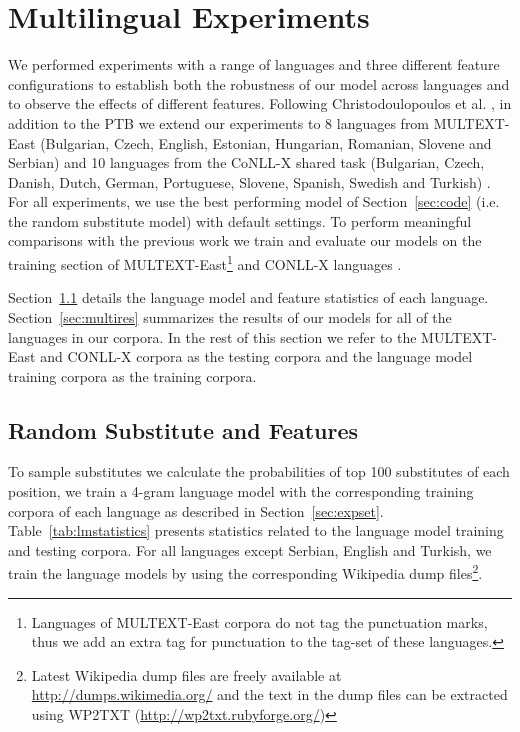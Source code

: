 \section{Multilingual Experiments}
\label{sec:multilang}
\noindent We performed experiments with a range of languages and three
different feature configurations to establish both the robustness of
our model across languages and to observe the effects of different
features.  Following Christodoulopoulos et
al. , in
addition to the PTB we extend our experiments to 8 languages from
MULTEXT-East (Bulgarian, Czech, English, Estonian, Hungarian,
Romanian, Slovene and Serbian) \cite{citeulike:5820223} and 10
languages from the CoNLL-X shared task (Bulgarian, Czech, Danish,
Dutch, German, Portuguese, Slovene, Spanish, Swedish and Turkish)
\cite{Buchholz:2006:CST:1596276.1596305}.  For all experiments, we use
the best performing model of Section~\ref{sec:code} (i.e. the random
substitute model) with default settings.  To perform meaningful
comparisons with the previous work we train and evaluate our models on
the training section of MULTEXT-East\footnote{Languages of
  MULTEXT-East corpora do not tag the punctuation marks, thus we add
  an extra tag for punctuation to the tag-set of these languages.} and
CONLL-X languages \cite{Lee:2010:STU:1870658.1870741}.

Section~\ref{sec:multivecfeat} details the language model and feature
statistics of each language.  Section~\ref{sec:multires} summarizes
the results of our models for all of the languages in our corpora.  In
the rest of this section we refer to the MULTEXT-East and CONLL-X
corpora as the testing corpora and the language model training corpora
as the training corpora.

\subsection{Random Substitute and Features}
\label{sec:multivecfeat}

To sample substitutes we calculate the probabilities of top 100
substitutes of each position, we train a 4-gram language model with
the corresponding training corpora of each language as described in
Section~\ref{sec:expset}.  Table~\ref{tab:lmstatistics} presents
statistics related to the language model training and testing corpora.
For all languages except Serbian, English and Turkish, we train the
language models by using the corresponding Wikipedia dump
files\footnote{Latest Wikipedia dump files are freely available at
  \url{http://dumps.wikimedia.org/} and the text in the dump files can
  be extracted using WP2TXT (\url{http://wp2txt.rubyforge.org/})}.

